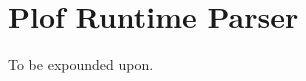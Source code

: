 \chapter{Plof Runtime Parser}

To be expounded upon.


\begin{comment}
\subsection{Runtime Grammar Definitions}

There are several PSL operations which can only be run while in an \textit{immediate} block, and affect the runtime parser itself. They are:



<table border="0" cellspacing="0" cellpadding="0" class="Table2"><colgroup><col width="49"/><col width="115"/><col width="604"/></colgroup><tr><td style="text-align:left;width:0.4444in; " class="Table2_A1"><p class="P22">Hex

</td><td style="text-align:left;width:1.0354in; " class="Table2_B1"><p class="P22">Name

</td><td style="text-align:left;width:5.4451in; " class="Table2_B1"><p class="P22">Function

</td></tr><tr><td style="text-align:left;width:0.4444in; " class="Table2_A2"><p class="P21">

</td><td style="text-align:left;width:1.0354in; " class="Table2_B2"><p class="P21">

</td><td style="text-align:left;width:5.4451in; " class="Table2_B2"><p class="P21">Operations F0-F5 do not affect the grammar immediately, the changes must be committed with \textit{gcommit}.

</td></tr><tr><td style="text-align:left;width:0.4444in; " class="Table2_A1"><p class="P21">F0

</td><td style="text-align:left;width:1.0354in; " class="Table2_B1"><p class="P21">gadd

</td><td style="text-align:left;width:5.4451in; " class="Table2_B1"><p class="P21">Add a production to the grammar. Pops the production name, the production itself, and the associated PSL code. The production itself is an array of strings (as raw data), each of which is either:

<ul><li><p class="P32" style="margin-left:0.635cm;"><span class="Bullet_20_Symbols" style="display:block;float:left;min-width:0.635cm;">•.</span>The name of another production, or<span class="odfLiEnd"/>


\end{comment}
